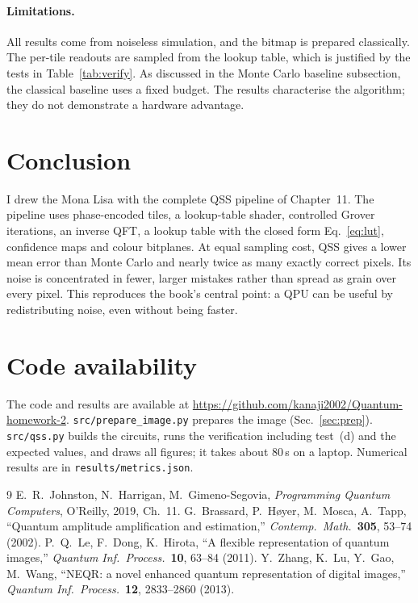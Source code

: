\documentclass[10pt,twocolumn,a4paper]{article}
\begin{document}
\paragraph{Limitations.}
All results come from noiseless simulation, and the bitmap is prepared
classically. The per-tile readouts are sampled from the lookup table, which is
justified by the tests in Table~\ref{tab:verify}. As discussed in the Monte
Carlo baseline subsection, the classical baseline uses a fixed budget. The
results characterise the algorithm; they do not demonstrate a hardware
advantage.

\section{Conclusion}
I drew the Mona Lisa with the complete QSS pipeline of Chapter~11. The
pipeline uses phase-encoded tiles, a lookup-table shader, controlled Grover
iterations, an inverse QFT, a lookup table with the closed form
Eq.~\eqref{eq:lut}, confidence maps and colour bitplanes. At equal sampling
cost, QSS gives a lower mean error than Monte Carlo and nearly twice as many
exactly correct pixels. Its noise is concentrated in fewer, larger mistakes
rather than spread as grain over every pixel. This reproduces the book's
central point: a QPU can be useful by redistributing noise, even without
being faster.

\section*{Code availability}
The code and results are available at
\url{https://github.com/kanaji2002/Quantum-homework-2}.
\texttt{src/prepare\_image.py} prepares the image (Sec.~\ref{sec:prep}).
\texttt{src/qss.py} builds the circuits, runs the verification including
test~(d) and the expected values, and draws all figures; it takes about
80\,s on a laptop. Numerical results are in \texttt{results/metrics.json}.

\begin{thebibliography}{9}\small
{} E.~R.~Johnston, N.~Harrigan, M.~Gimeno-Segovia,
\emph{Programming Quantum Computers}, O'Reilly, 2019, Ch.~11.
 G.~Brassard, P.~H{\o}yer, M.~Mosca, A.~Tapp, ``Quantum
amplitude amplification and estimation,'' \emph{Contemp.\ Math.}\
\textbf{305}, 53--74 (2002).
 P.~Q.~Le, F.~Dong, K.~Hirota, ``A flexible representation of
quantum images,'' \emph{Quantum Inf.\ Process.}\ \textbf{10}, 63--84 (2011).
\bibitem{neqr} Y.~Zhang, K.~Lu, Y.~Gao, M.~Wang, ``NEQR: a novel enhanced
quantum representation of digital images,'' \emph{Quantum Inf.\ Process.}\
\textbf{12}, 2833--2860 (2013).
\end{thebibliography}
\end{document}
